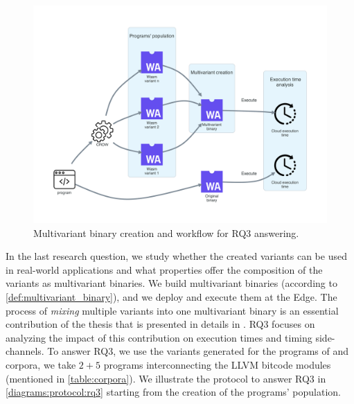 
\section{\rqthree}
\label{rq3:method}




\newcommand{\mewe}{MEWE\xspace}

\begin{figure}[h]
    \centering
    \includegraphics[width=0.8\linewidth]{diagrams/Rq3.pdf}
    \caption{Multivariant binary creation and workflow for RQ3 answering.}
    \label{diagrams:protocol:rq3}
\end{figure}


In the last research question, we study whether the created variants can be used in real-world applications and what properties offer the composition of the variants as multivariant binaries. We build multivariant binaries (according to \autoref{def:multivariant_binary}), and we deploy and execute them at the Edge. The process of \emph{mixing} multiple variants into one multivariant binary is an essential contribution of the thesis that is presented in details in \cite{2021arXiv210808125C}. RQ3 focuses on analyzing the impact of this contribution on execution times and timing side-channels. To answer RQ3, we use the variants generated for the programs of \corpussodium and \corpusqrcode corpora, we take $2 + 5$ programs interconnecting the LLVM bitcode modules (mentioned in \autoref{table:corpora}). We illustrate the protocol to answer RQ3 in \autoref{diagrams:protocol:rq3} starting from the creation of the programs' population.




